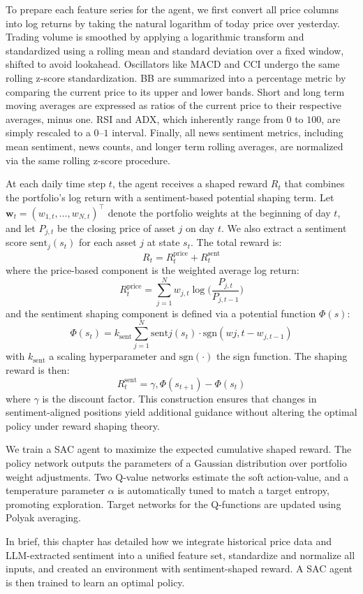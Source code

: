 To prepare each feature series for the agent, we first convert all price columns  into log returns by taking the natural logarithm of today price over yesterday. Trading volume is smoothed by applying a logarithmic transform and standardized using a rolling mean and standard deviation over a fixed window, shifted to avoid lookahead. Oscillators like \gls{MACD} and \gls{CCI} undergo the same rolling z-score standardization. \gls{BB} are summarized into a percentage metric by comparing the current price to its upper and lower bands. Short and long term moving averages are expressed as ratios of the current price to their respective averages, minus one. \gls{RSI} and \gls{ADX}, which inherently range from \(0\) to \(100\), are simply rescaled to a \(0\)–\(1\) interval. Finally, all news sentiment metrics, including mean sentiment, news counts, and longer term rolling averages, are normalized via the same rolling z-score procedure. 

At each daily time step \(t\), the agent receives a shaped reward \(R_t\) that combines the portfolio’s log return with a sentiment-based potential shaping term. Let \(\mathbf{w}_t = (w_{1,t},\dots,w_{N,t})^\top\) denote the portfolio weights at the beginning of day \(t\), and let \(P_{j,t}\) be the closing price of asset \(j\) on day \(t\). We also extract a sentiment score \(\mathrm{sent}_j(s_t)\) for each asset \(j\) at state \(s_t\). The total reward is:
\[R_t = R_t^{\mathrm{price}} + R_t^{\mathrm{sent}}\]
where the price-based component is the weighted average log return:
\[R_t^{\mathrm{price}} = \sum_{j=1}^N w_{j,t} \log \biggl(\frac{P_{j,t}}{P_{j,t-1}}\biggr)\]
and the sentiment shaping component is defined via a potential function $\Phi(s)$:
\[\Phi(s_t) = k_{\mathrm{sent}} \sum_{j=1}^N \mathrm{sent}j(s_t) \cdot \mathrm{sgn}(w{j,t} - w_{j,t-1})\]
with \(k_{\mathrm{sent}}\) a scaling hyperparameter and \(\mathrm{sgn}(\cdot)\) the sign function. The shaping reward is then:
\[R_t^{\mathrm{sent}} = \gamma,\Phi(s_{t+1}) - \Phi(s_t)\]
where \(\gamma\) is the discount factor. This construction ensures that changes in sentiment-aligned positions yield additional guidance without altering the optimal policy under reward shaping theory.

We train a \gls{SAC} agent to maximize the expected cumulative shaped reward. The policy network outputs the parameters of a Gaussian distribution over portfolio weight adjustments. Two Q-value networks estimate the soft action-value, and a temperature parameter \(\alpha\) is automatically tuned to match a target entropy, promoting exploration. Target networks for the Q-functions are updated using Polyak averaging.

In brief, this chapter has detailed how we integrate historical price data and \gls{LLM}-extracted sentiment into a unified feature set, standardize and normalize all inputs, and created an environment with sentiment-shaped reward. A \gls{SAC} agent is then trained to learn an optimal policy.
